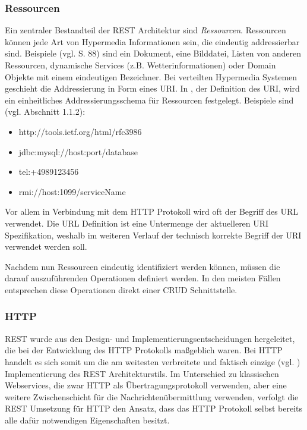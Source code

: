 \subsubsection{Ressourcen}
Ein zentraler Bestandteil der \ac{REST} Architektur sind \emph{Ressourcen}.
Ressourcen können jede Art von Hypermedia Informationen sein, die eindeutig
addressierbar sind. Beispiele (vgl. \cite{fielding:2000} S. 88) sind ein
Dokument, eine Bilddatei, Listen von anderen Ressourcen, dynamische Services
(z.B. Wetterinformationen) oder Domain Objekte mit einem eindeutigen Bezeichner.
Bei verteilten Hypermedia Systemen geschieht die Addressierung in Form
eines \ac{URI}. In \cite{rfc3986}, der Definition des \ac{URI}, wird ein
einheitliches Addressierungsschema für Ressourcen festgelegt. Beispiele sind
(vgl. \cite{rfc3986} Abschnitt 1.1.2):
\begin{itemize}
  \item http://tools.ietf.org/html/rfc3986
  \item jdbc:mysql://host:port/database
  \item tel:+4989123456
  \item rmi://host:1099/serviceName
\end{itemize}
Vor allem in Verbindung mit dem \ac{HTTP} Protokoll wird oft der Begriff des
\ac{URL} verwendet. Die \ac{URL} Definition ist eine Untermenge der aktuelleren
\ac{URI} Spezifikation, weshalb im weiteren Verlauf der technisch korrekte
Begriff der \ac{URI} verwendet werden soll.

Nachdem nun Ressourcen eindeutig identifiziert werden können, müssen die darauf
auszuführenden Operationen definiert werden. In den meisten Fällen entsprechen
diese Operationen direkt einer \ac{CRUD} Schnittstelle.

\subsubsection{HTTP}\label{subsub:http}
\ac{REST} wurde aus den Design- und Implementierungsentscheidungen hergeleitet,
die bei der Entwicklung des \ac{HTTP} Protokolls maßgeblich waren. Bei \ac{HTTP}
handelt es sich somit um die am weitesten verbreitete und faktisch einzige (vgl.
\cite{tilkov:2009}) Implementierung des \ac{REST} Architekturstils. Im
Unterschied zu klassischen Webservices, die zwar \ac{HTTP} als
Übertragungsprotokoll verwenden, aber eine weitere Zwischenschicht für die
Nachrichtenübermittlung verwenden, verfolgt die \ac{REST} Umsetzung für \ac{HTTP}
den Ansatz, dass das \ac{HTTP} Protokoll selbst bereits alle dafür notwendigen
Eigenschaften besitzt.

